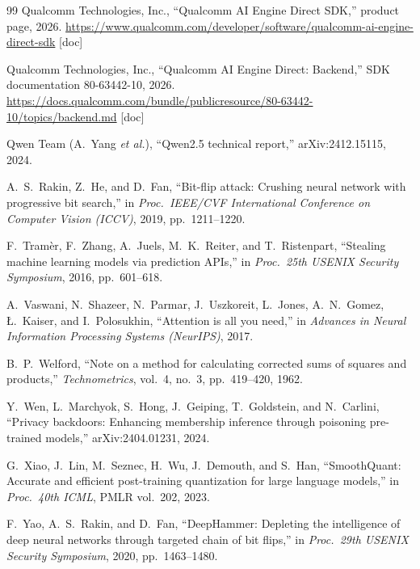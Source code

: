 \begin{thebibliography}{99}
Qualcomm Technologies, Inc., ``Qualcomm AI Engine Direct SDK,'' product page, 2026.
\url{https://www.qualcomm.com/developer/software/qualcomm-ai-engine-direct-sdk} [doc]

Qualcomm Technologies, Inc., ``Qualcomm AI Engine Direct: Backend,'' SDK documentation
80-63442-10, 2026. \url{https://docs.qualcomm.com/bundle/publicresource/80-63442-10/topics/backend.md} [doc]

Qwen Team (A.~Yang \textit{et al.}), ``Qwen2.5 technical report,'' arXiv:2412.15115, 2024.

A.~S.~Rakin, Z.~He, and D.~Fan, ``Bit-flip attack: Crushing neural network with progressive bit
search,'' in \textit{Proc.\ IEEE/CVF International Conference on Computer Vision (ICCV)}, 2019,
pp.~1211--1220.

F.~Tram\`er, F.~Zhang, A.~Juels, M.~K.~Reiter, and T.~Ristenpart, ``Stealing machine learning
models via prediction APIs,'' in \textit{Proc.\ 25th USENIX Security Symposium}, 2016,
pp.~601--618.

A.~Vaswani, N.~Shazeer, N.~Parmar, J.~Uszkoreit, L.~Jones, A.~N.~Gomez, \L.~Kaiser, and
I.~Polosukhin, ``Attention is all you need,'' in \textit{Advances in Neural Information Processing
Systems (NeurIPS)}, 2017.

B.~P.~Welford, ``Note on a method for calculating corrected sums of squares and products,''
\textit{Technometrics}, vol.~4, no.~3, pp.~419--420, 1962.

Y.~Wen, L.~Marchyok, S.~Hong, J.~Geiping, T.~Goldstein, and N.~Carlini, ``Privacy backdoors:
Enhancing membership inference through poisoning pre-trained models,'' arXiv:2404.01231, 2024.

G.~Xiao, J.~Lin, M.~Seznec, H.~Wu, J.~Demouth, and S.~Han, ``SmoothQuant: Accurate and efficient
post-training quantization for large language models,'' in \textit{Proc.\ 40th ICML}, PMLR
vol.~202, 2023.

F.~Yao, A.~S.~Rakin, and D.~Fan, ``DeepHammer: Depleting the intelligence of deep neural networks
through targeted chain of bit flips,'' in \textit{Proc.\ 29th USENIX Security Symposium}, 2020,
pp.~1463--1480.

\end{thebibliography}
